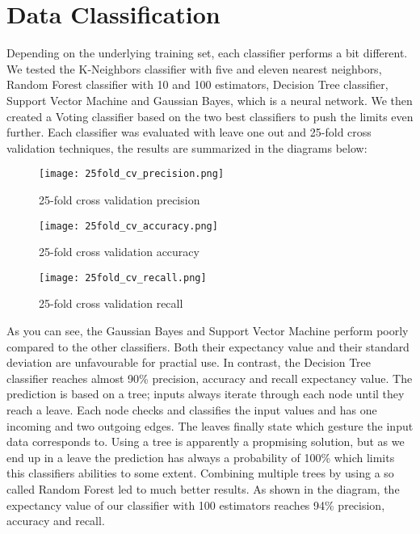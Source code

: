 \section{Data Classification}
\label{ch:DataCollection:sec:DataClassification}

Depending on the underlying training set, each classifier performs a bit different. We tested the K-Neighbors classifier with five and eleven nearest neighbors, Random Forest classifier with 10 and 100 estimators,  Decision Tree classifier, Support Vector Machine and Gaussian Bayes, which is a neural network. We then created a Voting classifier based on the two best classifiers to push the limits even further. Each classifier was evaluated with leave one out and 25-fold cross validation techniques, the results are summarized in the diagrams below:


\begin{figure}[!htb]
  \texttt{[image: 25fold\_cv\_precision.png]}
  \caption{25-fold cross validation precision}\label{fig:precision}
\endminipage\hfill
{}
  \texttt{[image: 25fold\_cv\_accuracy.png]}
  \caption{25-fold cross validation accuracy}\label{fig:accuracy}
\endminipage\hfill
{}%
  \texttt{[image: 25fold\_cv\_recall.png]}
  \caption{25-fold cross validation recall}\label{fig:recall}
\endminipage
\end{figure}

As you can see, the Gaussian Bayes and Support Vector Machine perform poorly compared to the other classifiers. Both their expectancy value and their standard deviation are unfavourable for practial use. In contrast, the Decision Tree classifier reaches almost 90\% precision, accuracy and recall expectancy value. The prediction is based on a tree; inputs always iterate through each node until they reach a leave. Each node checks and classifies the input values and has one incoming and two outgoing edges. The leaves finally state which gesture the input data corresponds to. Using a tree is apparently a propmising solution, but as we end up in a leave the prediction has always a probability of 100\% which limits this classifiers abilities to some extent. Combining multiple trees by using a so called Random Forest led to much better results. As shown in the diagram, the expectancy value of our classifier with 100 estimators reaches 94\% precision, accuracy and recall. 


